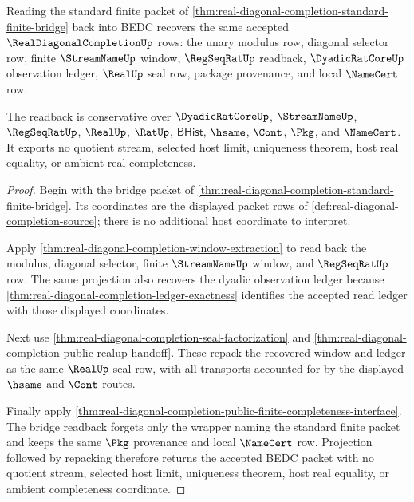 \begin{theorem}
\label{thm:real-diagonal-completion-bridge-readback-roundtrip}
Reading the standard finite packet of \autoref{thm:real-diagonal-completion-standard-finite-bridge} back into BEDC recovers the same accepted $\RealDiagonalCompletionUp$ rows: the unary modulus row, diagonal selector row, finite $\StreamNameUp$ window, $\RegSeqRatUp$ readback, $\DyadicRatCoreUp$ observation ledger, $\RealUp$ seal row, package provenance, and local $\NameCert$ row.

The readback is conservative over $\DyadicRatCoreUp$, $\StreamNameUp$, $\RegSeqRatUp$, $\RealUp$, $\RatUp$, $\mathsf{BHist}$, $\hsame$, $\Cont$, $\Pkg$, and $\NameCert$. It exports no quotient stream, selected host limit, uniqueness theorem, host real equality, or ambient real completeness.
\end{theorem}
\begin{proof}
Begin with the bridge packet of \autoref{thm:real-diagonal-completion-standard-finite-bridge}. Its coordinates are the displayed packet rows of \autoref{def:real-diagonal-completion-source}; there is no additional host coordinate to interpret.

Apply \autoref{thm:real-diagonal-completion-window-extraction} to read back the modulus, diagonal selector, finite $\StreamNameUp$ window, and $\RegSeqRatUp$ row. The same projection also recovers the dyadic observation ledger because \autoref{thm:real-diagonal-completion-ledger-exactness} identifies the accepted read ledger with those displayed coordinates.

Next use \autoref{thm:real-diagonal-completion-seal-factorization} and \autoref{thm:real-diagonal-completion-public-realup-handoff}. These repack the recovered window and ledger as the same $\RealUp$ seal row, with all transports accounted for by the displayed $\hsame$ and $\Cont$ routes.

Finally apply \autoref{thm:real-diagonal-completion-public-finite-completeness-interface}. The bridge readback forgets only the wrapper naming the standard finite packet and keeps the same $\Pkg$ provenance and local $\NameCert$ row. Projection followed by repacking therefore returns the accepted BEDC packet with no quotient stream, selected host limit, uniqueness theorem, host real equality, or ambient completeness coordinate.
\end{proof}

